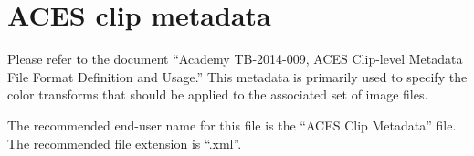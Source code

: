 \numberedformat
\chapter{ACES clip metadata}

Please refer to the document ``Academy TB-2014-009, ACES Clip-level Metadata File Format Definition and Usage.'' This metadata is primarily used to specify the color transforms that should be applied to the associated set of image files.

The recommended end-user name for this file is the ``ACES Clip Metadata'' file. The recommended file extension is ``.xml''.